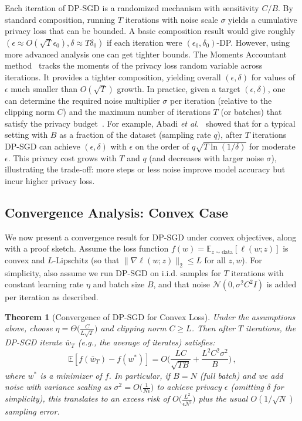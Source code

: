 \documentclass[11pt]{article}
\newtheorem{theorem}{Theorem}
\theoremstyle{remark}
\theoremstyle{definition}
\theoremstyle{plain}
\begin{document}
Each iteration of DP-SGD is a randomized mechanism with sensitivity $C/B$. By standard composition, running $T$ iterations with noise scale $\sigma$ yields a cumulative privacy loss that can be bounded. A basic composition result would give roughly $(\epsilon\approx O(\sqrt{T}\epsilon_0), \delta \approx T\delta_0)$ if each iteration were $(\epsilon_0,\delta_0)$-DP. However, using more advanced analysis one can get tighter bounds. The Moments Accountant method~\cite{Abadi2016} tracks the moments of the privacy loss random variable across iterations. It provides a tighter composition, yielding overall $(\epsilon, \delta)$ for values of $\epsilon$ much smaller than $O(\sqrt{T})$ growth. In practice, given a target $(\epsilon, \delta)$, one can determine the required noise multiplier $\sigma$ per iteration (relative to the clipping norm $C$) and the maximum number of iterations $T$ (or batches) that satisfy the privacy budget~\cite{Abadi2016}. For example, Abadi \textit{et al.}~\cite{Abadi2016} showed that for a typical setting with $B$ as a fraction of the dataset (sampling rate $q$), after $T$ iterations DP-SGD can achieve $(\epsilon, \delta)$ with $\epsilon$ on the order of $q\sqrt{T \ln(1/\delta)}$ for moderate $\epsilon$. This privacy cost grows with $T$ and $q$ (and decreases with larger noise $\sigma$), illustrating the trade-off: more steps or less noise improve model accuracy but incur higher privacy loss.

\subsection{Convergence Analysis: Convex Case}

We now present a convergence result for DP-SGD under convex objectives, along with a proof sketch. Assume the loss function $f(w) = \mathbb{E}_{z\sim \text{data}}[\ell(w; z)]$ is convex and $L$-Lipschitz (so that $\|\nabla \ell(w;z)\|_2 \le L$ for all $z, w$). For simplicity, also assume we run DP-SGD on i.i.d. samples for $T$ iterations with constant learning rate $\eta$ and batch size $B$, and that noise $\mathcal{N}(0,\sigma^2 C^2 I)$ is added per iteration as described.

\begin{theorem}[Convergence of DP-SGD for Convex Loss]\label{thm:convex-dpsgd}
Under the assumptions above, choose $\eta = \Theta\Big(\frac{C}{L\sqrt{T}}\Big)$ and clipping norm $C \ge L$. Then after $T$ iterations, the DP-SGD iterate $\bar{w}_T$ (e.g., the average of iterates) satisfies:
\[
\mathbb{E}[f(\bar{w}_T) - f(w^*)] = O\Big(\frac{L C}{\sqrt{T B}} + \frac{L^2 C^2 \sigma^2}{B}\Big)\,,
\] 
where $w^*$ is a minimizer of $f$. In particular, if $B = N$ (full batch) and we add noise with variance scaling as $\sigma^2 = O\!\Big(\frac{1}{N\epsilon}\Big)$ to achieve privacy $\epsilon$ (omitting $\delta$ for simplicity), this translates to an excess risk of $O\Big(\frac{L^2}{\epsilon N^2}\Big)$ plus the usual $O(1/\sqrt{N})$ sampling error.
\end{theorem}
\end{document}
